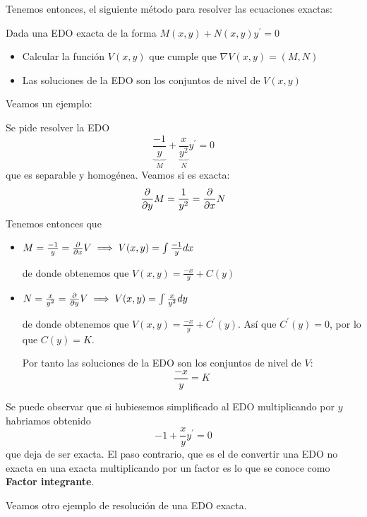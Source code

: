 \documentclass{mathnotes}
\begin{document}
Tenemos entonces, el siguiente método para resolver las ecuaciones exactas:
\begin{method}
Dada una EDO exacta de la forma $M(x,y) + N(x,y)y^\prime = 0$
\begin{itemize}
\item Calcular la función $V(x,y)$ que cumple que $\nabla V(x,y) = (M,N)$
\item Las soluciones de la EDO son los conjuntos de nivel de $V(x,y)$
\end{itemize}
\end{method}

Veamos un ejemplo:

\begin{example}
Se pide resolver la EDO $$\underbrace{\frac{-1}{y}}_M+\underbrace{\frac{x}{y^2}}_Ny^\prime = 0$$ que es separable y homogénea.
Veamos si es exacta: $$\frac{\partial}{\partial y}M = \frac{1}{y^2} = \frac{\partial}{\partial x}N$$
Tenemos entonces que 
\begin{itemize}
\item $M = \frac{-1}{y} = \frac{\partial}{\partial x}V \implies V(x,y) = \int \frac{-1}{y}dx$

de donde obtenemos que $V(x,y) = \frac{-x}{y} + C(y)$

\item $N = \frac{x}{y^2} = \frac{\partial}{\partial y}V \implies V(x,y) = \int \frac{x}{y^2}dy$

de donde obtenemos que $V(x,y) = \frac{-x}{y} + C^\prime(y)$. Así que $C^\prime(y) = 0$, por lo que $C(y) = K$.

Por tanto las soluciones de la EDO son los conjuntos de nivel de $V$: $$\frac{-x}{y} = K$$
\end{itemize}

Se puede observar que si hubiesemos simplificado al EDO multiplicando por $y$ habriamos obtenido $$-1+\frac{x}{y}y^\prime = 0$$ que deja de ser exacta. El paso contrario, que es el de convertir una EDO no exacta en una exacta multiplicando por un factor es lo que se conoce como \textbf{Factor integrante}.
\end{example}

Veamos otro ejemplo de resolución de una EDO exacta.
\end{document}
